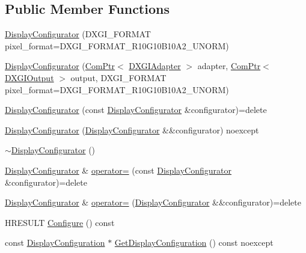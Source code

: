\subsection*{Public Member Functions}
\begin{DoxyCompactItemize}
\item 
\hyperlink{classmage_1_1rendering_1_1_display_configurator_aa59a82202ffcfdc458f1d7c02ccef93e}{Display\+Configurator} (D\+X\+G\+I\+\_\+\+F\+O\+R\+M\+AT pixel\+\_\+format=D\+X\+G\+I\+\_\+\+F\+O\+R\+M\+A\+T\+\_\+\+R10\+G10\+B10\+A2\+\_\+\+U\+N\+O\+RM)
\item 
\hyperlink{classmage_1_1rendering_1_1_display_configurator_a38b10a77ab471b8d9ea836a19879c173}{Display\+Configurator} (\hyperlink{namespacemage_ae74f374780900893caa5555d1031fd79}{Com\+Ptr}$<$ \hyperlink{namespacemage_1_1rendering_ad55e028ebd705b547eeb972ad8d03b6a}{D\+X\+G\+I\+Adapter} $>$ adapter, \hyperlink{namespacemage_ae74f374780900893caa5555d1031fd79}{Com\+Ptr}$<$ \hyperlink{namespacemage_1_1rendering_aaf22d3893277a4bd8497f6ea69b01532}{D\+X\+G\+I\+Output} $>$ output, D\+X\+G\+I\+\_\+\+F\+O\+R\+M\+AT pixel\+\_\+format=D\+X\+G\+I\+\_\+\+F\+O\+R\+M\+A\+T\+\_\+\+R10\+G10\+B10\+A2\+\_\+\+U\+N\+O\+RM)
\item 
\hyperlink{classmage_1_1rendering_1_1_display_configurator_aa1c3dbea2453d12d3478db4724c78728}{Display\+Configurator} (const \hyperlink{classmage_1_1rendering_1_1_display_configurator}{Display\+Configurator} \&configurator)=delete
\item 
\hyperlink{classmage_1_1rendering_1_1_display_configurator_ac75dae1c4df34dda067f1a5d99fdfefa}{Display\+Configurator} (\hyperlink{classmage_1_1rendering_1_1_display_configurator}{Display\+Configurator} \&\&configurator) noexcept
\item 
\hyperlink{classmage_1_1rendering_1_1_display_configurator_a5ccba8cd97da75a7d1c425731fb848d4}{$\sim$\+Display\+Configurator} ()
\item 
\hyperlink{classmage_1_1rendering_1_1_display_configurator}{Display\+Configurator} \& \hyperlink{classmage_1_1rendering_1_1_display_configurator_affd6a3486be8564246628a6a20518ac2}{operator=} (const \hyperlink{classmage_1_1rendering_1_1_display_configurator}{Display\+Configurator} \&configurator)=delete
\item 
\hyperlink{classmage_1_1rendering_1_1_display_configurator}{Display\+Configurator} \& \hyperlink{classmage_1_1rendering_1_1_display_configurator_afa750c6d058e2298dd6bb9cf44d54f06}{operator=} (\hyperlink{classmage_1_1rendering_1_1_display_configurator}{Display\+Configurator} \&\&configurator)=delete
\item 
H\+R\+E\+S\+U\+LT \hyperlink{classmage_1_1rendering_1_1_display_configurator_abeafddcb31aea4ee7235ca5509f1b321}{Configure} () const
\item 
const \hyperlink{classmage_1_1rendering_1_1_display_configuration}{Display\+Configuration} $\ast$ \hyperlink{classmage_1_1rendering_1_1_display_configurator_a5b0440099e3e31977ffaf8072c9fb33f}{Get\+Display\+Configuration} () const noexcept
\end{DoxyCompactItemize}
